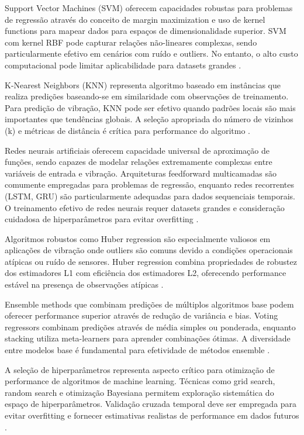 Support Vector Machines (SVM) oferecem capacidades robustas para problemas de regressão através do conceito de margin maximization e uso de kernel functions para mapear dados para espaços de dimensionalidade superior. SVM com kernel RBF pode capturar relações não-lineares complexas, sendo particularmente efetivo em cenários com ruído e outliers. No entanto, o alto custo computacional pode limitar aplicabilidade para datasets grandes \cite{vapnik1998statistical}.

K-Nearest Neighbors (KNN) representa algoritmo baseado em instâncias que realiza predições baseando-se em similaridade com observações de treinamento. Para predição de vibração, KNN pode ser efetivo quando padrões locais são mais importantes que tendências globais. A seleção apropriada do número de vizinhos (k) e métricas de distância é crítica para performance do algoritmo \cite{cover1967nearest}.

Redes neurais artificiais oferecem capacidade universal de aproximação de funções, sendo capazes de modelar relações extremamente complexas entre variáveis de entrada e vibração. Arquiteturas feedforward multicamadas são comumente empregadas para problemas de regressão, enquanto redes recorrentes (LSTM, GRU) são particularmente adequadas para dados sequenciais temporais. O treinamento efetivo de redes neurais requer datasets grandes e consideração cuidadosa de hiperparâmetros para evitar overfitting \cite{goodfellow2016deep}.

Algoritmos robustos como Huber regression são especialmente valiosos em aplicações de vibração onde outliers são comuns devido a condições operacionais atípicas ou ruído de sensores. Huber regression combina propriedades de robustez dos estimadores L1 com eficiência dos estimadores L2, oferecendo performance estável na presença de observações atípicas \cite{huber1964robust}.

Ensemble methods que combinam predições de múltiplos algoritmos base podem oferecer performance superior através de redução de variância e bias. Voting regressors combinam predições através de média simples ou ponderada, enquanto stacking utiliza meta-learners para aprender combinações ótimas. A diversidade entre modelos base é fundamental para efetividade de métodos ensemble \cite{zhou2012ensemble}.

A seleção de hiperparâmetros representa aspecto crítico para otimização de performance de algoritmos de machine learning. Técnicas como grid search, random search e otimização Bayesiana permitem exploração sistemática do espaço de hiperparâmetros. Validação cruzada temporal deve ser empregada para evitar overfitting e fornecer estimativas realistas de performance em dados futuros \cite{bergstra2012random}.

